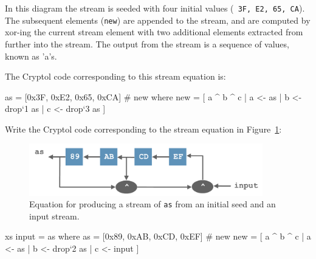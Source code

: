 In this diagram the stream is seeded with four initial values ({\tt
  3F, E2, 65, CA}). The subsequent elements ({\tt new}) are appended
to the stream, and are computed by xor-ing the current stream element
with two additional elements extracted from further into the stream.
The output from the stream is a sequence of values, known as 'a's.

The Cryptol code corresponding to this stream equation is:
\begin{code}
  as  = [0x3F, 0xE2, 0x65, 0xCA] # new
    where
      new = [ a ^ b ^ c | a <- as
                        | b <- drop`{1} as
                        | c <- drop`{3} as ]
\end{code}

{}

\begin{Exercise}\label{ex:streamEq}
  Write the Cryptol code corresponding to the stream equation in
  Figure~\ref{fig:streamExercise}:
\end{Exercise}
\begin{figure}[htbp]
\centering
\includegraphics[width=4in]{crashCourse/streamExercise}
\caption{Equation for producing a stream of {\tt as} from an initial
  seed and an input stream.}
\label{fig:streamExercise}
\end{figure}


\begin{Answer}
\begin{code}
  xs input = as where
     as = [0x89, 0xAB, 0xCD, 0xEF] # new 
     new = [ a ^ b ^ c | a <- as
                       | b <- drop`{2} as
                       | c <- input ]
\end{code}
\end{Answer}

\indTypSynonym

